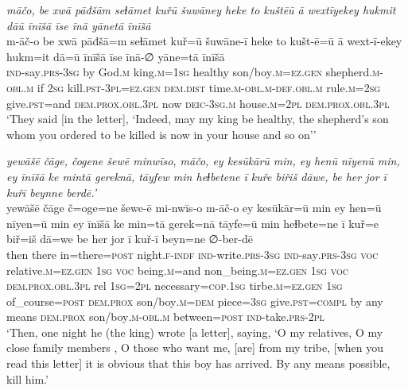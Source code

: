 \ea \label{KŠ.51}
\textit{māčo, be xwā pāđšām seɫāmet kuřū šuwāney heke to kuštēū ā wextīyekey hukmit dāū īnīšā īse īnā yānetā īnīšā} \\ 
\gll m-āč-o be xwā pāđšā=m seɫāmet kuř=ū šuwāne-ī heke to kušt-ē=ū ā wext-ī-ekey hukm=it dā=ū īnīšā īse īnā-∅ yāne=tā īnīšā \\ 
 \textsc{ind-}say\textsc{.prs}\textsc{-3sg} by God\textsc{.m} king\textsc{.m}\textsc{=\textsc{1sg}} healthy son/boy\textsc{.m}\textsc{=ez.gen} shepherd\textsc{.m}\textsc{-obl}\textsc{.m} if \textsc{2sg} kill\textsc{.pst}\textsc{-3pl}\textsc{=ez.gen} \textsc{dem.dist} time\textsc{.m}\textsc{-obl}\textsc{.m}\textsc{-def}\textsc{.obl}\textsc{.m} rule\textsc{.m}\textsc{=\textsc{2sg}} give\textsc{.pst}=and \textsc{dem.prox}\textsc{.obl}\textsc{.3pl} now \textsc{deic}\textsc{-3sg}\textsc{.m} house\textsc{.m}=\textsc{2pl} \textsc{dem.prox}\textsc{.obl}\textsc{.3pl} \\ 
\glt `They said [in the letter], ‘Indeed, may my king be healthy, the shepherd’s son whom you ordered to be killed is now in your house and so on’'
\z 
 
\ea \label{KŠ.56}
\textit{yewāšē čāge, čogene šewē minwīso, māčo, ey kesūkārū min, ey henū nīyenū min, ey īnīšā ke mintā gereknā, tāyfew min heɫbetene ī kuře biřiš dāwe, be her jor ī kuřī beynne berdē.’} \\ 
\gll yewāšē čāge č=oge=ne šewe-ē mi-nwīs-o m-āč-o ey kesūkār=ū min ey hen=ū nīyen=ū min ey īnīšā ke min=tā gerek=nā tāyfe=ū min heɫbete=ne ī kuř=e biř=iš dā=we be her jor ī kuř-ī beyn=ne ∅-ber-dē \\ 
 then there in=there\textsc{=\textsc{post}} night\textsc{.f}\textsc{-indf} \textsc{ind-}write\textsc{.prs}\textsc{-3sg} \textsc{ind-}say\textsc{.prs}\textsc{-3sg} \textsc{voc} relative\textsc{.m}\textsc{\textsc{=ez.gen}} \textsc{1sg} \textsc{voc} being\textsc{.m}=and non\_being\textsc{.m}\textsc{\textsc{=ez.gen}} \textsc{1sg} \textsc{voc} \textsc{dem.prox}\textsc{.obl}\textsc{.3pl} rel \textsc{1sg}=\textsc{2pl} necessary\textsc{=cop}\textsc{.\textsc{1sg}} tirbe\textsc{.m}\textsc{\textsc{=ez.gen}} \textsc{1sg} of\_course\textsc{=\textsc{post}} \textsc{dem.prox} son/boy\textsc{.m}\textsc{=dem} piece\textsc{=3sg} give\textsc{.pst}\textsc{=compl} by any means \textsc{dem.prox} son/boy\textsc{.m}\textsc{-obl}\textsc{.m} between\textsc{=\textsc{post}} \textsc{ind-}take\textsc{.prs}-\textsc{2pl} \\ 
\glt `Then, one night he (the king) wrote [a letter], saying, ‘O my relatives, O my close family members , O those who want me, [are] from my tribe, [when you read this letter] it is obvious that this boy has arrived. By any means possible, kill him.'
\z 
 
